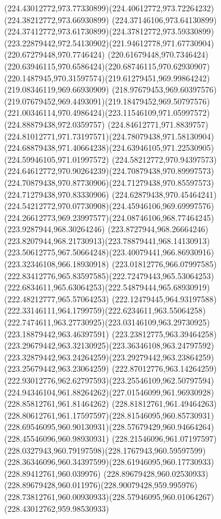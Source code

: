 {{	\curveto(224.43012772,973.77330899)(224.40612772,973.72264232)(224.38212772,973.66930899)
	\curveto(224.37146106,973.64130899)(224.37412772,973.61730899)(224.37812772,973.59330899)
	\curveto(223.22879442,972.54130902)(221.94612778,971.67730904)(220.67279448,970.7746424)
	\curveto(220.61679448,970.7346424)(220.63946115,970.6586424)(220.68746115,970.62930907)
	\curveto(220.1487945,970.31597574)(219.61279451,969.99864242)(219.08346119,969.66930909)
	\curveto(218.97679453,969.60397576)(219.07679452,969.4493091)(219.18479452,969.50797576)
	\curveto(221.00346114,970.4986424)(223.11546109,971.05997572)(224.88879438,972.0359757)
	\curveto(224.84612771,971.8839757)(224.81012771,971.73197571)(224.78079438,971.58130904)
	\curveto(224.68879438,971.40664238)(224.63946105,971.22530905)(224.59946105,971.01997572)
	\curveto(224.58212772,970.94397573)(224.64612772,970.90264239)(224.70879438,970.89997573)
	\curveto(224.70879438,970.87730906)(224.71279438,970.85597573)(224.71279438,970.83330906)
	\curveto(224.62879438,970.45464241)(224.54212772,970.07730908)(224.45946106,969.69997576)
	\curveto(224.26612773,969.23997577)(224.08746106,968.77464245)(223.9287944,968.30264246)
	\curveto(223.8727944,968.26664246)(223.8207944,968.21730913)(223.78879441,968.14130913)
	\curveto(223.50612775,967.50664248)(223.40079441,966.86930916)(223.32346108,966.18930918)
	\curveto(223.01812776,966.07997585)(222.83412776,965.83597585)(222.72479443,965.53064253)
	\curveto(222.6834611,965.63064253)(222.54879444,965.68930919)(222.48212777,965.57064253)
	\curveto(222.12479445,964.93197588)(222.33146111,964.1799759)(222.6234611,963.55064258)
	\curveto(222.7474611,963.27730925)(223.03146109,963.29730925)(223.18879442,963.46397591)
	\curveto(223.23812775,963.39464258)(223.29679442,963.32130925)(223.36346108,963.24797592)
	\curveto(223.32879442,963.24264259)(223.29279442,963.23864259)(223.25679442,963.23064259)
	\curveto(222.87012776,963.14264259)(222.93012776,962.62797593)(223.25546109,962.50797594)
	\curveto(224.94346104,961.88264262)(227.01546099,961.96930928)(228.85812761,961.81464262)
	\curveto(228.81812761,961.49464263)(228.80612761,961.17597597)(228.81546095,960.85730931)
	\curveto(228.69546095,960.90130931)(228.57679429,960.94664264)(228.45546096,960.98930931)
	\curveto(228.21546096,961.07197597)(228.0327943,960.79197598)(228.1767943,960.59597599)
	\curveto(228.36346096,960.34397599)(228.61946095,960.17730933)(228.89412761,960.039976)
	\curveto(228.89679428,960.02530933)(228.89679428,960.011976)(228.90079428,959.995976)
	\curveto(228.73812761,960.00930933)(228.57946095,960.01064267)(228.43012762,959.98530933)
}}
